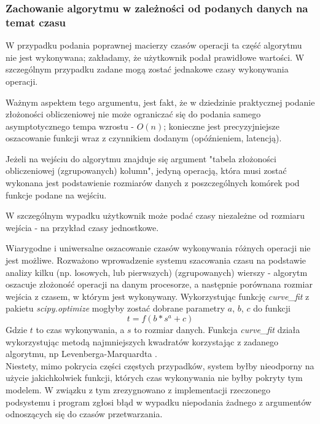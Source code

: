 \documentclass[brudnopis]{xmgr}
\begin{document}
\subsubsection{Zachowanie algorytmu w zależności od podanych danych na temat czasu}


W przypadku podania poprawnej macierzy czasów operacji ta część algorytmu nie jest wykonywana; zakładamy, że użytkownik podał prawidłowe wartości.
W szczególnym przypadku zadane mogą zostać jednakowe czasy wykonywania operacji.


Ważnym aspektem tego argumentu, jest fakt, że w dziedzinie praktycznej podanie złożoności obliczeniowej nie może ograniczać się do podania samego asymptotycznego tempa wzrostu - $O(n)$; konieczne jest precyzyjniejsze oszacowanie funkcji wraz z czynnikiem dodanym (opóźnieniem, latencją).
\medskip

Jeżeli na wejściu do algorytmu znajduje się argument "tabela złożoności obliczeniowej (zgrupowanych) kolumn", jedyną operacją, która musi zostać wykonana jest podstawienie rozmiarów danych z poszczególnych komórek pod funkcje podane na wejściu.
\medskip

W szczególnym wypadku użytkownik może podać czasy niezależne od rozmiaru wejścia - na przykład czasy jednostkowe.
\medskip


Wiarygodne i uniwersalne oszacowanie czasów wykonywania różnych operacji nie jest możliwe.
Rozważono wprowadzenie systemu szacowania czasu na podstawie analizy kilku (np. losowych, lub pierwszych) (zgrupowanych) wierszy - algorytm oszacuje złożoność operacji na danym procesorze, a następnie porównana rozmiar wejścia z czasem, w którym jest wykonywany.
Wykorzystując funkcję \emph{curve\_fit} z pakietu \emph{scipy.optimize} mogłyby zostać dobrane parametry $a$, $b$, $c$ do funkcji
$$t = f(b * s^a + c)$$
Gdzie $t$ to czas wykonywania, a $s$ to rozmiar danych.
Funkcja \emph{curve\_fit} działa wykorzystując metodą najmniejszych kwadratów korzystając z zadanego algorytmu, np Levenberga-Marquardta \cite{lourakis2005brief}.\\
Niestety, mimo pokrycia części częstych przypadków, system byłby nieodporny na użycie jakichkolwiek funkcji, których czas wykonywania nie byłby pokryty tym modelem.
W związku z tym zrezygnowano z implementacji rzeczonego podsystemu i program zgłosi błąd w wypadku niepodania żadnego z argumentów odnoszących się do czasów przetwarzania.
\medskip
\end{document}
